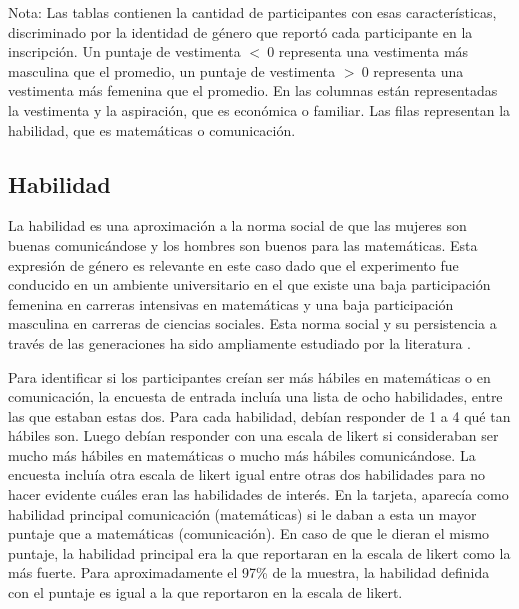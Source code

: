 \begin{table}
\begin{subtable}{\textwidth}
{\begin{tabular}{cccccc}
        \end{tabular}}
    \end{subtable}
    \begin{threeparttable} 
    \begin{tablenotes}
    \scriptsize{
    \item Nota: Las tablas contienen la cantidad de participantes con esas características, discriminado por la identidad de género que reportó cada participante en la inscripción. Un puntaje de vestimenta $<\ 0$ representa una vestimenta más masculina que el promedio, un puntaje de vestimenta $>\ 0$ representa una vestimenta más femenina que el promedio. En las columnas están representadas la vestimenta y la aspiración, que es económica o familiar. Las filas representan la habilidad, que es matemáticas o comunicación.}
    \end{tablenotes}
    \end{threeparttable}
\end{table}

\subsection{Habilidad} 
La habilidad es una aproximación a la norma social de que las mujeres son buenas comunicándose y los hombres son buenos para las matemáticas. Esta expresión de género es relevante en este caso dado que el experimento fue conducido en un ambiente universitario en el que existe una baja participación femenina en carreras intensivas en matemáticas y una baja participación masculina en carreras de ciencias sociales. Esta norma social y su persistencia a través de las generaciones ha sido ampliamente estudiado por la literatura \citep{nollenberger2016mathgap, giuliano2017gender, saltiel2019gendergapinSTEM, spencer1999mathgenderstereotype, cvencek2011mathgenderstereotype}.

Para identificar si los participantes creían ser más hábiles en matemáticas o en comunicación, la encuesta de entrada incluía una lista de ocho habilidades, entre las que estaban estas dos. Para cada habilidad, debían responder de 1 a 4 qué tan hábiles son. Luego debían responder con una escala de likert si consideraban ser mucho más hábiles en matemáticas o mucho más hábiles comunicándose. La encuesta incluía otra escala de likert igual entre otras dos habilidades para no hacer evidente cuáles eran las habilidades de interés. En la tarjeta, aparecía como habilidad principal comunicación (matemáticas) si le daban a esta un mayor puntaje que a matemáticas (comunicación). En caso de que le dieran el mismo puntaje, la habilidad principal era la que reportaran en la escala de likert como la más fuerte. Para aproximadamente el 97\% de la muestra, la habilidad definida con el puntaje es igual a la que reportaron en la escala de likert. 

